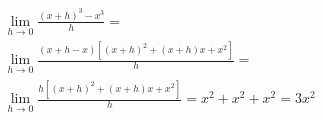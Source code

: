 \begin{ex}
\begin{align}
&\lim_{h\rightarrow 0} \frac{(x+h)^3-x^3}{h}=\nonumber\\
&\lim_{h\rightarrow 0} \frac{(x+h-x)[(x+h)^2+(x+h)x+x^2]}{h}=\nonumber\\
&\lim_{h\rightarrow 0} \frac{h[(x+h)^2+(x+h)x+x^2]}{h}=x^2+x^2+x^2=3x^2\nonumber
\end{align}
\end{ex}